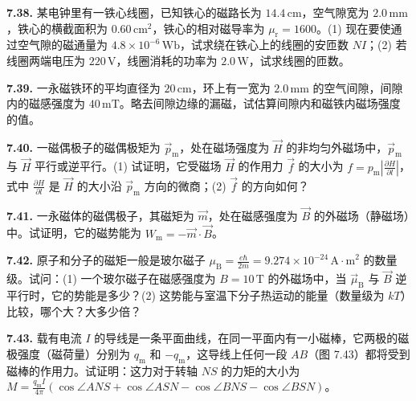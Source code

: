 \begin{center}
\end{center}

\vfill
\newpage

\textbf{7.38.} 某电钟里有一铁心线圈，已知铁心的磁路长为 $14.4\,\mathrm{cm}$，空气隙宽为 $2.0\,\mathrm{mm}$，铁心的横截面积为 $0.60\,\mathrm{cm}^{2}$，铁心的相对磁导率为 $\mu_{\mathrm{r}} = 1600$。(1) 现在要使通过空气隙的磁通量为 $4.8 \times 10^{-6}\,\mathrm{Wb}$，试求绕在铁心上的线圈的安匝数 $NI$；(2) 若线圈两端电压为 $220\,\mathrm{V}$，线圈消耗的功率为 $2.0\,\mathrm{W}$，试求线圈的匝数。

\vfill
\newpage

\textbf{7.39.} 一永磁铁环的平均直径为 $20\,\mathrm{cm}$，环上有一宽为 $2.0\,\mathrm{mm}$ 的空气间隙，间隙内的磁感强度为 $40\,\mathrm{mT}$。略去间隙边缘的漏磁，试估算间隙内和磁铁内磁场强度的值。

\vfill
\newpage

\textbf{7.40.} 一磁偶极子的磁偶极矩为 $\vec{p}_{\mathrm{m}}$，处在磁场强度为 $\vec{H}$ 的非均匀外磁场中，$\vec{p}_{\mathrm{m}}$ 与 $\vec{H}$ 平行或逆平行。(1) 试证明，它受磁场 $\vec{H}$ 的作用力 $\vec{f}$ 的大小为 $\displaystyle f = p_{\mathrm{m}}\left|\frac{\partial H}{\partial l}\right|$，式中 $\displaystyle \frac{\partial H}{\partial l}$ 是 $\vec{H}$ 的大小沿 $\vec{p}_{\mathrm{m}}$ 方向的微商；(2) $\vec{f}$ 的方向如何？

\vfill
\newpage

\textbf{7.41.} 一永磁体的磁偶极子，其磁矩为 $\vec{m}$，处在磁感强度为 $\vec{B}$ 的外磁场（静磁场）中。试证明，它的磁势能为 $W_{\mathrm{m}} = -\vec{m}\cdot\vec{B}$。

\vfill
\newpage

\textbf{7.42.} 原子和分子的磁矩一般是玻尔磁子 $\displaystyle \mu_{\mathrm{B}} = \frac{e\hbar}{2m} = 9.274\times 10^{-24}\,\mathrm{A\cdot m}^{2}$ 的数量级。试问：(1) 一个玻尔磁子在磁感强度为 $B = 10\,\mathrm{T}$ 的外磁场中，当 $\vec{\mu}_{\mathrm{B}}$ 与 $\vec{B}$ 逆平行时，它的势能是多少？(2) 这势能与室温下分子热运动的能量（数量级为 $kT$）比较，哪个大？大多少倍？

\vfill
\newpage

\textbf{7.43.} 载有电流 $I$ 的导线是一条平面曲线，在同一平面内有一小磁棒，它两极的磁极强度（磁荷量）分别为 $q_{\mathrm{m}}$ 和 $-q_{\mathrm{m}}$，这导线上任何一段 $AB$（图 7.43）都将受到磁棒的作用力。试证明：这力对于转轴 $NS$ 的力矩的大小为 $\displaystyle M = \frac{q_{\mathrm{m}}I}{4\pi}(\cos\angle ANS + \cos\angle ASN - \cos\angle BNS - \cos\angle BSN)$。

